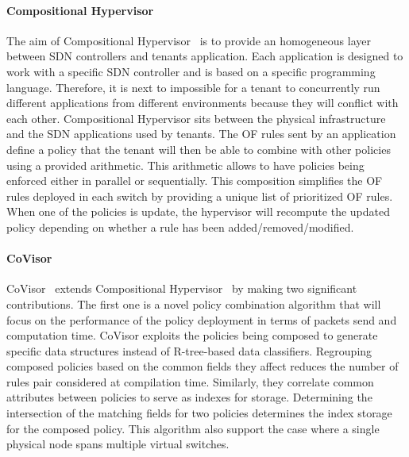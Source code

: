 \paragraph{Compositional Hypervisor}
The aim of Compositional Hypervisor~\cite{CompositionalHypervisor-Jin2014} is to provide an homogeneous layer between SDN controllers and tenants application.
Each application is designed to work with a specific SDN controller and is based on a specific programming language. Therefore, it is next to impossible for a tenant to concurrently run different applications from different environments because they will conflict with each other. Compositional Hypervisor sits between the physical infrastructure and the SDN applications used by tenants.
The OF rules sent by an application define a policy that the tenant will then be able to combine with other policies using a provided arithmetic.
This arithmetic allows to have policies being enforced either in parallel or sequentially. This composition simplifies the OF rules deployed in each switch by providing a unique list of prioritized OF rules. When one of the policies is update, the hypervisor will recompute the updated policy depending on whether a rule has been added/removed/modified.

\paragraph{CoVisor}
CoVisor~\cite{CoVisor-Jin2015} extends Compositional Hypervisor~\cite{CompositionalHypervisor-Jin2014} by making two significant contributions.
The first one is a novel policy combination algorithm that will focus on the performance of the policy deployment in terms of packets send and computation time.
CoVisor exploits the policies being composed to generate specific data structures instead of R-tree-based data classifiers.
Regrouping composed policies based on the common fields they affect reduces the number of rules pair considered at compilation time.
Similarly, they correlate common attributes between policies to serve as indexes for storage. Determining the intersection of the matching fields for two policies determines the index storage for the composed policy.
This algorithm also support the case where a single physical node spans multiple virtual switches.

